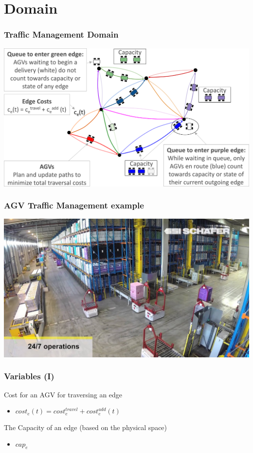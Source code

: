 \documentclass{beamer}
\begin{document}
	\section{Domain}
	\begin{frame}
		\frametitle{Traffic Management Domain}
		\includegraphics[width=\textwidth]{enviroment.png}
	\end{frame}
	\begin{frame}
		\frametitle{AGV Traffic Management example}
		\includegraphics[width=\textwidth]{warehouse.jpg}
	\end{frame}
	\begin{frame}
		\frametitle{Variables (I)}
		Cost for an AGV for traversing an edge
		\begin{itemize}
			\item $cost_e(t) = cost_e^{travel} + cost_e^{add}(t)$
		\end{itemize}
		The Capacity of an edge (based on the physical space)
		\begin{itemize}
			\item $cap_e$
		\end{itemize}
	\end{frame}
\end{document}
